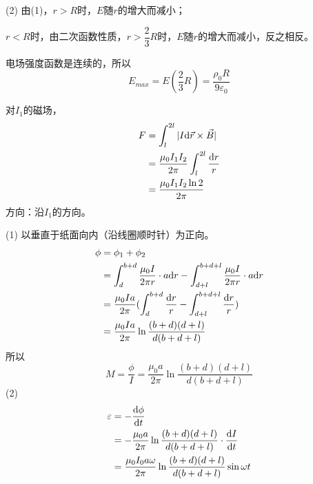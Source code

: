(2) 由(1)，$r>R$时，$E$随$r$的增大而减小；

$r<R$时，由二次函数性质，$r>\dfrac{2}{3}R$时，$E$随$r$的增大而减小，反之相反。

电场强度函数是连续的，所以
\[
	E_{max}=E(\dfrac{2}{3}R)=\dfrac{\rho_0R}{9\varepsilon_0}
\]

对$I_1$的磁场，
\begin{align*}
	F&=\int_l^{2l}|I\mathrm{d}\vec{r}\times \vec{B}|\\
	&=\dfrac{\mu_0I_1I_2}{2\pi}\int_l^{2l}\dfrac{\mathrm{d}r}{r}\\
	&=\dfrac{\mu_0I_1I_2\ln 2}{2\pi}
\end{align*}
方向：沿$I_1$的方向。

(1) \amperecircuitaltheorem{}以垂直于纸面向内（沿线圈顺时针）为正向。
\begin{align*}
	\phi&=\phi_1+\phi_2\\
	&=\int_{d}^{b+d}\dfrac{\mu_0I}{2\pi r}\cdot a\mathrm{d}r
	-\int_{d+l}^{b+d+l}\dfrac{\mu_0I}{2\pi r}\cdot a\mathrm{d}r\\
	&=\dfrac{\mu_0Ia}{2\pi}(\int_{d}^{b+d}\dfrac{\mathrm{d}r}{r}-\int_{d+l}^{b+d+l}\dfrac{\mathrm{d}r}{r})\\
	&=\dfrac{\mu_0Ia}{2\pi}\ln\dfrac{(b+d)(d+l)}{d(b+d+l)}
\end{align*}
所以
\[
	M=\dfrac{\phi}{I}=\dfrac{\mu_0a}{2\pi}\ln\dfrac{(b+d)(d+l)}{d(b+d+l)}
\]
(2) 
\begin{align*}
	\varepsilon&=-\dfrac{\mathrm{d}\phi}{\mathrm{d}t}\\
	&=-\dfrac{\mu_0a}{2\pi}\ln\dfrac{(b+d)(d+l)}{d(b+d+l)}\cdot\dfrac{\mathrm{d}I}{\mathrm{d}t}\\
	&=\dfrac{\mu_0I_0a\omega}{2\pi}\ln\dfrac{(b+d)(d+l)}{d(b+d+l)}\sin\omega t
\end{align*}

